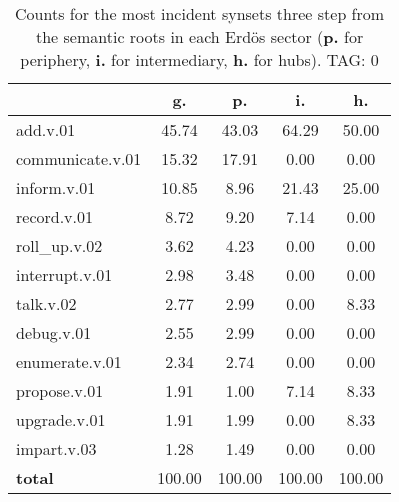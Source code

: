 \begin{table}[h!]
\begin{center}
\begin{tabular}{| l || c | c | c | c |}\hline
 & {\bf g.} & {\bf p.} & {\bf i.} & {\bf h.} \\\hline\hline
add.v.01 & 45.74  & 43.03  & 64.29  & 50.00 \\\hline
communicate.v.01 & 15.32  & 17.91  & 0.00  & 0.00 \\\hline
inform.v.01 & 10.85  & 8.96  & 21.43  & 25.00 \\\hline
record.v.01 & 8.72  & 9.20  & 7.14  & 0.00 \\\hline
roll\_up.v.02 & 3.62  & 4.23  & 0.00  & 0.00 \\\hline
interrupt.v.01 & 2.98  & 3.48  & 0.00  & 0.00 \\\hline
talk.v.02 & 2.77  & 2.99  & 0.00  & 8.33 \\\hline
debug.v.01 & 2.55  & 2.99  & 0.00  & 0.00 \\\hline
enumerate.v.01 & 2.34  & 2.74  & 0.00  & 0.00 \\\hline
propose.v.01 & 1.91  & 1.00  & 7.14  & 8.33 \\\hline
upgrade.v.01 & 1.91  & 1.99  & 0.00  & 8.33 \\\hline
impart.v.03 & 1.28  & 1.49  & 0.00  & 0.00 \\\hline\hline
{{\bf total}} & 100.00  & 100.00  & 100.00  & 100.00 \\\hline
\end{tabular}
\caption{Counts for the most incident synsets three step from the semantic roots in each Erd\"os sector ({\bf p.} for periphery, {\bf i.} for intermediary, {\bf h.} for hubs). TAG: 0}
\end{center}
\end{table}